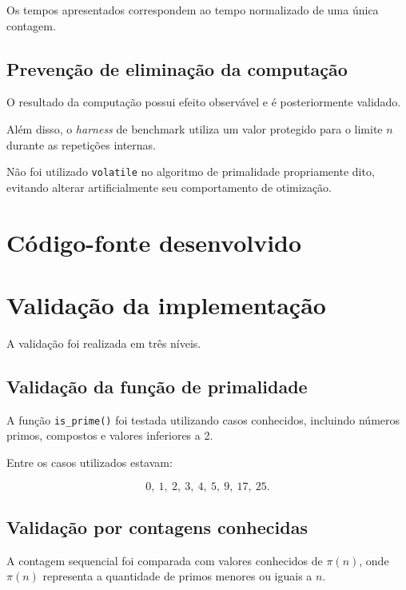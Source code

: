 Os tempos apresentados correspondem ao tempo normalizado de uma única
contagem.


\subsection{Prevenção de eliminação da computação}

O resultado da computação possui efeito observável e é posteriormente
validado.

Além disso, o \textit{harness} de benchmark utiliza um valor protegido para
o limite \(n\) durante as repetições internas.

Não foi utilizado \texttt{volatile} no algoritmo de primalidade propriamente
dito, evitando alterar artificialmente seu comportamento de otimização.


\section{Código-fonte desenvolvido}
\label{sec:atvd05-codigo}




\section{Validação da implementação}
\label{sec:atvd05-validacao}

A validação foi realizada em três níveis.


\subsection{Validação da função de primalidade}

A função \texttt{is\_prime()} foi testada utilizando casos conhecidos,
incluindo números primos, compostos e valores inferiores a 2.

Entre os casos utilizados estavam:

\[
0,\ 1,\ 2,\ 3,\ 4,\ 5,\ 9,\ 17,\ 25.
\]


\subsection{Validação por contagens conhecidas}

A contagem sequencial foi comparada com valores conhecidos de
\(\pi(n)\), onde \(\pi(n)\) representa a quantidade de primos menores ou
iguais a \(n\).

